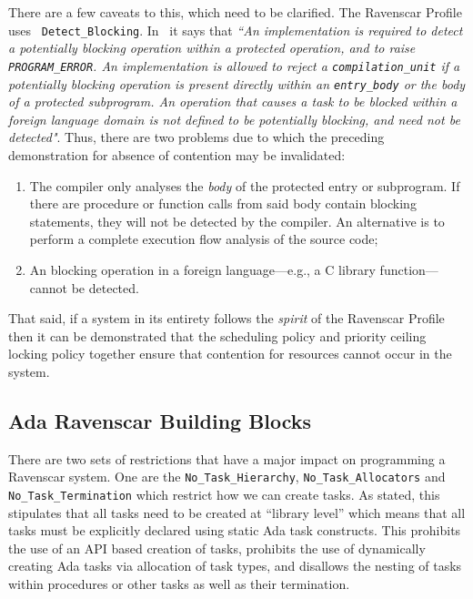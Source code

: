 There are a few caveats to this, which need to be clarified. The
Ravenscar Profile uses \texttt{
  Detect\_Blocking}. In~\cite{arm95} it says that \emph{``An
  implementation is required to detect a potentially blocking
  operation within a protected operation, and to raise
  \emph{\texttt{PROGRAM\_ERROR}}. An implementation is allowed to
  reject a \emph{\texttt{compilation\_unit}} if a potentially blocking
  operation is present directly within an \emph{\texttt{entry\_body}}
  or the body of a protected subprogram. An operation that causes a
  task to be blocked within a foreign language domain is not defined
  to be potentially blocking, and need not be detected"}. Thus, there
are two problems due to which the preceding demonstration for absence
of contention may be invalidated:
\begin{enumerate}
\item{The compiler only analyses the \emph{body} of the protected
  entry or subprogram. If there are procedure or function calls from
  said body contain blocking statements, they will not be detected by
  the compiler. An alternative is to perform a complete execution flow
  analysis of the source code;}
\item{An blocking operation in a foreign language---e.g., a C library
  function---cannot be detected.}
\end{enumerate}

That said, if a system in its entirety follows the \emph{spirit} of
the Ravenscar Profile then it can be demonstrated that the scheduling
policy and priority ceiling locking policy together ensure that
contention for resources cannot occur in the system.

\subsection{Ada Ravenscar Building Blocks}
There are two sets of restrictions that have a major impact on
programming a Ravenscar system. One are the
\texttt{No\_Task\_Hierarchy}, \texttt{No\_Task\_Allocators} and
\texttt{No\_Task\_Termination} which restrict how we can create
tasks. As stated, this stipulates that all tasks need to be created at
``library level'' which means that all tasks must be explicitly
declared using static Ada task constructs. This prohibits the use of
an API based creation of tasks, prohibits the use of dynamically
creating Ada tasks via allocation of task types, and disallows the
nesting of tasks within procedures or other tasks as well as their
termination.

